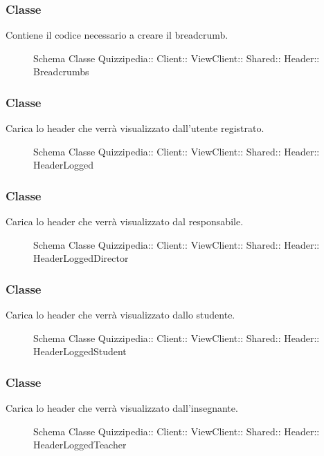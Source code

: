 \subsubsection{Classe }
Contiene il codice necessario a creare il breadcrumb.
\begin{figure}[H]
\centering
\noindent{}
\caption[Schema Classe Breadcrumbs]{Schema Classe Quizzipedia:: Client:: ViewClient:: Shared:: Header:: Breadcrumbs}
\end{figure}
\subsubsection{Classe }
Carica lo header che verrà visualizzato dall'utente registrato.
\begin{figure}[H]
\centering
\noindent{}
\caption[Schema Classe HeaderLogged]{Schema Classe Quizzipedia:: Client:: ViewClient:: Shared:: Header:: HeaderLogged}
\end{figure}
\subsubsection{Classe }
Carica lo header che verrà visualizzato dal responsabile.
\begin{figure}[H]
\centering
\noindent{}
\caption[Schema Classe HeaderLoggedDirector]{Schema Classe Quizzipedia:: Client:: ViewClient:: Shared:: Header:: HeaderLoggedDirector}
\end{figure}
\subsubsection{Classe }
Carica lo header che verrà visualizzato dallo studente.
\begin{figure}[H]
\centering
\noindent{}
\caption[Schema Classe HeaderLoggedStudent]{Schema Classe Quizzipedia:: Client:: ViewClient:: Shared:: Header:: HeaderLoggedStudent}
\end{figure}
\subsubsection{Classe }
Carica lo header che verrà visualizzato dall'insegnante.
\begin{figure}[H]
\centering
\noindent{}
\caption[Schema Classe HeaderLoggedTeacher]{Schema Classe Quizzipedia:: Client:: ViewClient:: Shared:: Header:: HeaderLoggedTeacher}
\end{figure}
